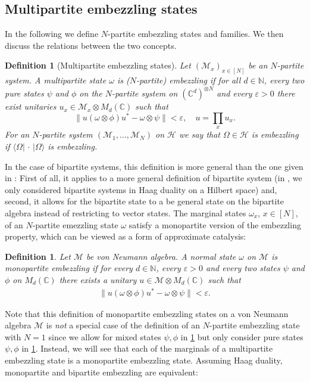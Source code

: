 \documentclass[a4paper, 10pt, onecolumn, accepted=2025-07-22]{quantumarticle}
\newtheorem{definition}[theorem]{Definition}
\theoremstyle{definition}
\newcommand{\ket}[1]{|#1\rangle}
\newcommand{\bra}[1]{\langle#1|}
\newcommand{\norm}[1]{\lVert #1\rVert}
\newcommand{\ox}{\otimes}
\newcommand{\mc}{\mathcal}
\newcommand{\eps}{\varepsilon}
\def\CC{{\mathbb C}}
\def\H{{\mc H}}
\def\M{{\mc M}}
\def\NN{{\mathbb N}}
\newcommand*{\1}{\text{\usefont{U}{bbold}{m}{n}1}}
\newcommand{\placeholder}[0]{{\,\cdot\,}}
\begin{document}
\subsection{Multipartite embezzling states}

In the following we define $N$-partite embezzling states and  families. We then discuss the relations between the two concepts.

\begin{definition}[Multipartite embezzling states]\label{def:mbz-state}
    Let $(\M_x)_{x\in[N]}$ be an $N$-partite system.
    A multipartite state $\omega$ is \emph{($N$-partite)} embezzling if for all $d\in\NN$, every two pure states $\psi$ and $\phi$ on the $N$-partite system on $(\CC^d)^{\otimes N}$ and every $\eps>0$ there exist unitaries $u_x\in \M_x \ox M_d(\CC)$ such that
\begin{equation}\label{eq:mixed state mbz}
    \norm{u (\omega\ox \phi)u^* - \omega \ox \psi} < \eps,\quad u=\prod_x u_x.
\end{equation}
For an $N$-partite system $(\M_1,\ldots,\M_N)$ on $\H$ we say that $\Omega\in\H$ is embezzling if $\bra\Omega\placeholder\ket\Omega$ is embezzling.
\end{definition}

In the case of bipartite systems, this definition is more general than the one given in \cite{long_paper}: First of all, it applies to a more general definition of bipartite system (in \cite{long_paper}, we only considered bipartite systems in Haag duality on a Hilbert space) and, second, it allows for the bipartite state to a be general state on the bipartite algebra instead of restricting to vector states.
The marginal states $\omega_x$, $x\in [N]$, of an $N$-partite emezzling state $\omega$ satisfy a monopartite version of the embezzling property, which can be viewed as a form of approximate catalysis:


\begin{definition}\label{def:mono}
    Let $\M$ be von Neumann algebra. A normal state $\omega$ on $\M$ is \emph{monopartite embezzling} if for every $d\in\NN$, every $\eps>0$ and every two states $\psi$ and $\phi$ on $M_d(\CC)$ there exists a unitary $u\in \M\ox M_d(\CC)$ such that
    \begin{align}
        \norm{u(\omega\ox\phi)u^* - \omega\ox\psi} <\eps.
    \end{align}
\end{definition}

Note that this definition of monopartite embezzling states on a von Neumann algebra $\M$ is \emph{not} a special case of the definition of an $N$-partite embezzling state with $N=1$ since we allow for mixed states $\psi,\phi$ in \cref{def:mono} but only consider pure states $\psi,\phi$ in \cref{def:mbz-state}. 
Instead, we will see that each of the marginals of a multipartite embezzling state is a monopartite embezzling state.
Assuming Haag duality, monopartite and bipartite embezzling are equivalent:
\end{document}
